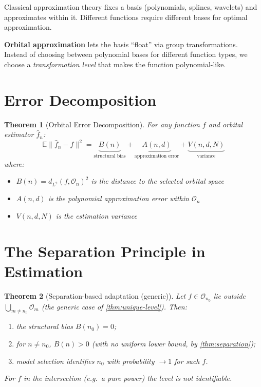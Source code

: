 \documentclass[11pt,twoside,openright]{book}
\theoremstyle{plain}
\newtheorem{theorem}{Theorem}[chapter]
\theoremstyle{definition}
\theoremstyle{remark}
\newcommand{\calO}{\mathcal{O}}
\newcommand{\norm}[1]{\|#1\|}
\newcommand{\E}{\mathbb{E}}
\begin{document}
Classical approximation theory fixes a basis (polynomials, splines, wavelets) and approximates within it. Different functions require different bases for optimal approximation.

\textbf{Orbital approximation} lets the basis ``float'' via group transformations. Instead of choosing between polynomial bases for different function types, we choose a \emph{transformation level} that makes the function polynomial-like.

\section{Error Decomposition}

\begin{theorem}[Orbital Error Decomposition]
\label{thm:orbital-error}
For any function $f$ and orbital estimator $\hat{f}_n$:
\begin{equation}
\E\norm{\hat{f}_n - f}^2 = \underbrace{B(n)}_{\text{structural bias}} + \underbrace{A(n, d)}_{\text{approximation error}} + \underbrace{V(n, d, N)}_{\text{variance}}
\label{eq:orbital-error}
\end{equation}
where:
\begin{itemize}
\item $B(n) = d_{L^2}(f, \calO_n)^2$ is the distance to the selected orbital space
\item $A(n, d)$ is the polynomial approximation error within $\calO_n$
\item $V(n, d, N)$ is the estimation variance
\end{itemize}
\end{theorem}

\section{The Separation Principle in Estimation}

\begin{theorem}[Separation-based adaptation (generic)]
\label{thm:separation-estimation}
Let $f \in \calO_{n_0}$ lie outside $\bigcup_{m\neq n_0}\calO_m$ (the generic case of \cref{thm:unique-level}). Then:
\begin{enumerate}
\item the structural bias $B(n_0) = 0$;
\item for $n \neq n_0$, $B(n) > 0$ (with no uniform lower bound, by \cref{thm:separation});
\item model selection identifies $n_0$ with probability $\to 1$ for such $f$.
\end{enumerate}
For $f$ in the intersection (e.g.\ a pure power) the level is not identifiable.
\end{theorem}
\end{document}
